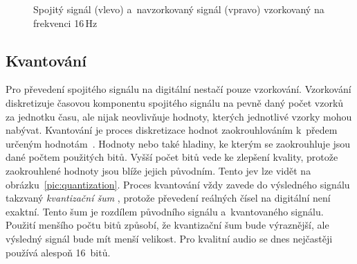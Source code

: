 \begin{figure}[hbt]
    \centering
    \begin{subfigure}[b]{0.5\linewidth}
        \centering
    \end{subfigure}%
    \begin{subfigure}[b]{0.5\linewidth}
        \centering
    \end{subfigure}
    \caption{Spojitý signál (vlevo) a~navzorkovaný signál (vpravo) vzorkovaný
    na frekvenci 16\,Hz}
    \label{pic:continuous-vs-sampled-signal}
\end{figure}

\subsection*{Kvantování}
\label{sub:quantization}

Pro převedení spojitého signálu na digitální nestačí pouze vzorkování.
Vzorkování diskretizuje časovou komponentu spojitého signálu na pevně daný
počet vzorků za jednotku času, ale nijak neovlivňuje hodnoty, kterých
jednotlivé vzorky mohou nabývat. Kvantování je proces diskretizace hodnot
zaokrouhlováním k~předem určeným hodnotám~\cite{Oliver1948}. Hodnoty nebo také
hladiny, ke kterým se zaokrouhluje jsou dané počtem použitých bitů. Vyšší počet
bitů vede ke zlepšení kvality, protože zaokrouhlené hodnoty jsou blíže jejich
původním. Tento jev lze vidět na obrázku~\ref{pic:quantization}. Proces
kvantování vždy zavede do výsledného signálu takzvaný \textit{kvantizační šum}
\cite{Oliver1948}, protože převedení reálných čísel na digitální není exaktní.
Tento šum je rozdílem původního signálu a~kvantovaného signálu. Použití menšího
počtu bitů způsobí, že kvantizační šum bude výraznější, ale výsledný signál
bude mít menší velikost. Pro kvalitní audio se dnes nejčastěji používá alespoň
16~bitů.

